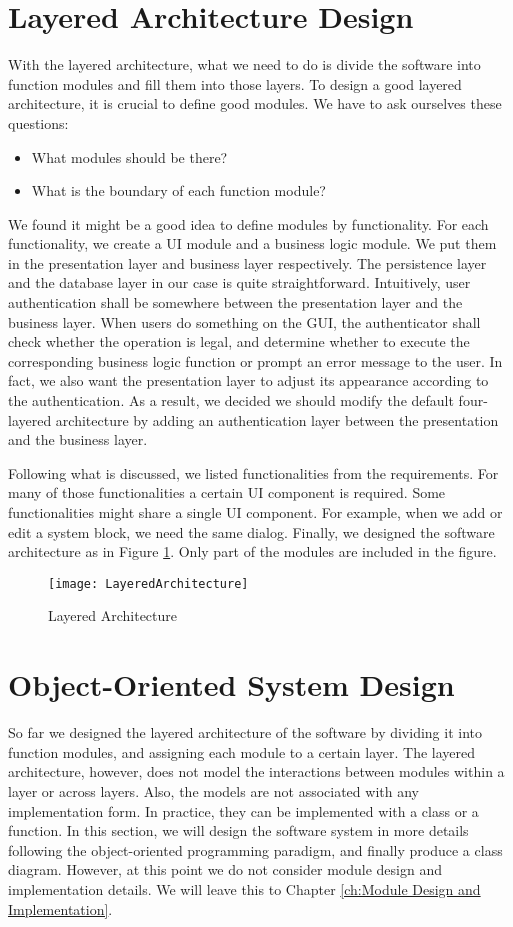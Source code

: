 \section{Layered Architecture Design}
With the layered architecture, what we need to do is divide the software into function modules and fill them into those layers. To design a good layered architecture, it is crucial to define good modules. We have to ask ourselves these questions:
\begin{itemize}
\item What modules should be there?
\item What is the boundary of each function module?
\end{itemize}

We found it might be a good idea to define modules by functionality. For each functionality, we create a UI module and a business logic module. We put them in the presentation layer and business layer respectively. The persistence layer and the database layer in our case is quite straightforward. Intuitively, user authentication shall be somewhere between the presentation layer and the business layer. When users do something on the GUI, the authenticator shall check whether the operation is legal, and determine whether to execute the corresponding business logic function or prompt an error message to the user. In fact, we also want the presentation layer to adjust its appearance according to the authentication. As a result, we decided we should modify the default four-layered architecture by adding an authentication layer between the presentation and the business layer.

Following what is discussed, we listed functionalities from the requirements. For many of those functionalities a certain UI component is required. Some functionalities might share a single UI component. For example, when we add or edit a system block, we need the same dialog. Finally, we designed the software architecture as in Figure \ref{fig:Layered Architecture}. Only part of the modules are included in the figure.

\begin{figure}[htb]
\centering
\texttt{[image: LayeredArchitecture]}
\caption{Layered Architecture\label{fig:Layered Architecture}}
\end{figure}

\section{Object-Oriented System Design}
So far we designed the layered architecture of the software by dividing it into function modules, and assigning each module to a certain layer. The layered architecture, however, does not model the interactions between modules within a layer or across layers. Also, the models are not associated with any implementation form. In practice, they can be implemented with a class or a function. In this section, we will design the software system in more details following the object-oriented programming paradigm, and finally produce a class diagram. However, at this point we do not consider module design and implementation details. We will leave this to Chapter \ref{ch:Module Design and Implementation}.

